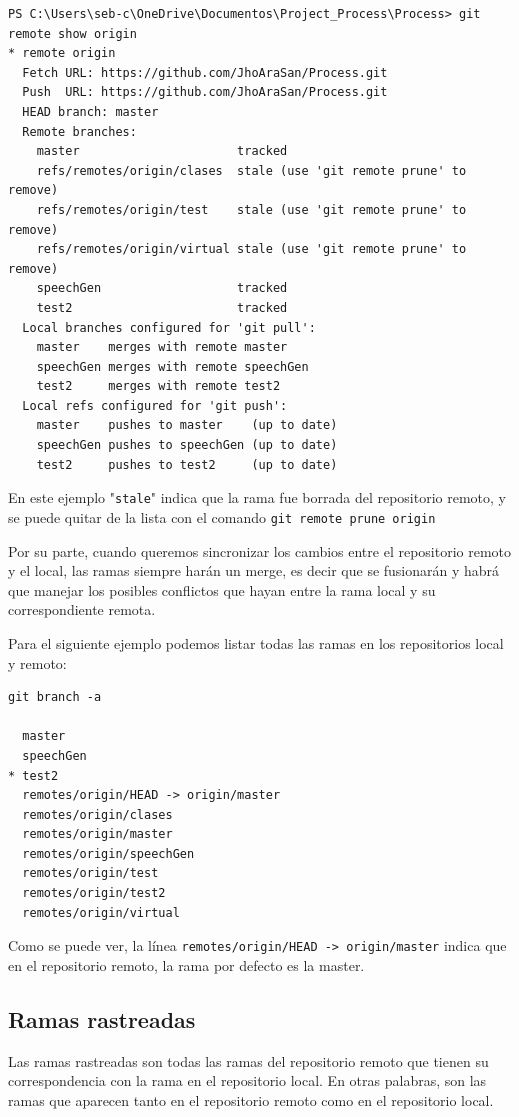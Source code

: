 \begin{verbatim}
PS C:\Users\seb-c\OneDrive\Documentos\Project_Process\Process> git remote show origin
* remote origin
  Fetch URL: https://github.com/JhoAraSan/Process.git
  Push  URL: https://github.com/JhoAraSan/Process.git
  HEAD branch: master
  Remote branches:
    master                      tracked
    refs/remotes/origin/clases  stale (use 'git remote prune' to remove)
    refs/remotes/origin/test    stale (use 'git remote prune' to remove)
    refs/remotes/origin/virtual stale (use 'git remote prune' to remove)
    speechGen                   tracked
    test2                       tracked
  Local branches configured for 'git pull':
    master    merges with remote master
    speechGen merges with remote speechGen
    test2     merges with remote test2
  Local refs configured for 'git push':
    master    pushes to master    (up to date)
    speechGen pushes to speechGen (up to date)
    test2     pushes to test2     (up to date)
\end{verbatim}

En este ejemplo "\texttt{stale}" indica que la rama fue borrada del repositorio remoto, y se puede quitar de la lista con el comando \texttt{git remote prune origin}

Por su parte, cuando queremos sincronizar los cambios entre el repositorio remoto y el local, las ramas siempre harán un merge, es decir que se fusionarán y habrá que manejar los posibles conflictos que hayan entre la rama local y su correspondiente remota.  

Para el siguiente ejemplo podemos listar todas las ramas en los repositorios local y remoto:

\begin{verbatim}
git branch -a     

  master
  speechGen
* test2
  remotes/origin/HEAD -> origin/master
  remotes/origin/clases
  remotes/origin/master
  remotes/origin/speechGen
  remotes/origin/test
  remotes/origin/test2
  remotes/origin/virtual
\end{verbatim}

Como se puede ver, la línea \texttt{remotes/origin/HEAD -> origin/master} indica que en el repositorio remoto, la rama por defecto es la master.

\subsection{Ramas rastreadas}

Las ramas rastreadas son todas las ramas del repositorio remoto que tienen su correspondencia con la rama en el repositorio local. En otras palabras, son las ramas que aparecen tanto en el repositorio remoto como en el repositorio local.

